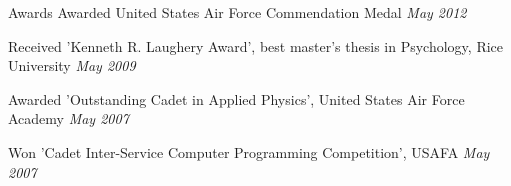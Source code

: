 
\begin{rSection}{Awards}
Awarded United States Air Force Commendation Medal \hfill {\em May 2012}
\item Received 'Kenneth R. Laughery Award', best master’s thesis in Psychology, Rice University \hfill {\em May 2009}
\item Awarded 'Outstanding Cadet in Applied Physics', United States Air Force Academy \hfill {\em May 2007}
\item Won 'Cadet Inter-Service Computer Programming Competition', USAFA \hfill {\em May 2007}
\end{rSection}
